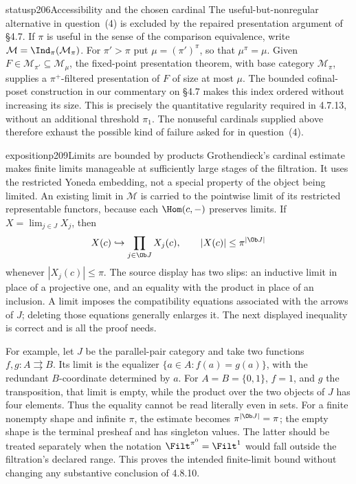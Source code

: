 \begin{dcomment}{status}{p206}{Accessibility and the chosen cardinal}
The useful-but-nonregular alternative in question~(4) is excluded by the repaired presentation argument of \S4.7. If $\pi$ is useful in the sense of the comparison equivalence, write $\mathcal M=\Ind_\pi(\mathcal M_\pi)$. For $\pi'>\pi$ put $\mu=(\pi')^\pi$, so that $\mu^\pi=\mu$. Given $F\in\mathcal M_{\pi'}\subseteq\mathcal M_\mu$, the fixed-point presentation theorem, with base category $\mathcal M_\pi$, supplies a $\pi^+$-filtered presentation of $F$ of size at most $\mu$. The bounded cofinal-poset construction in our commentary on \S4.7 makes this index ordered without increasing its size. This is precisely the quantitative regularity required in 4.7.13, without an additional threshold $\pi_1$. The nonuseful cardinals supplied above therefore exhaust the possible kind of failure asked for in question~(4).
\end{dcomment}

\begin{dcomment}{exposition}{p209}{Limits are bounded by products}
Grothendieck's cardinal estimate makes finite limits manageable at sufficiently large stages of the filtration. It uses the restricted Yoneda embedding, not a special property of the object being limited. An existing limit in $\mathcal M$ is carried to the pointwise limit of its restricted representable functors, because each $\Hom(c,-)$ preserves limits. If $X=\lim_{j\in J}X_j$, then
\[
 X(c)\hookrightarrow\prod_{j\in\Ob J}X_j(c),
 \qquad |X(c)|\leq\pi^{|\Ob J|}
\]
whenever $|X_j(c)|\leq\pi$. The source display has two slips: an inductive limit in place of a projective one, and an equality with the product in place of an inclusion. A limit imposes the compatibility equations associated with the arrows of $J$; deleting those equations generally enlarges it. The next displayed inequality is correct and is all the proof needs.

For example, let $J$ be the parallel-pair category and take two functions $f,g:A\rightrightarrows B$. Its limit is the equalizer $\{a\in A:f(a)=g(a)\}$, with the redundant $B$-coordinate determined by $a$. For $A=B=\{0,1\}$, $f=1$, and $g$ the transposition, that limit is empty, while the product over the two objects of $J$ has four elements. Thus the equality cannot be read literally even in sets. For a finite nonempty shape and infinite $\pi$, the estimate becomes $\pi^{|\Ob J|}=\pi$; the empty shape is the terminal presheaf and has singleton values. The latter should be treated separately when the notation $\Filt^{\pi^0}=\Filt^1$ would fall outside the filtration's declared range. This proves the intended finite-limit bound without changing any substantive conclusion of 4.8.10.
\end{dcomment}

